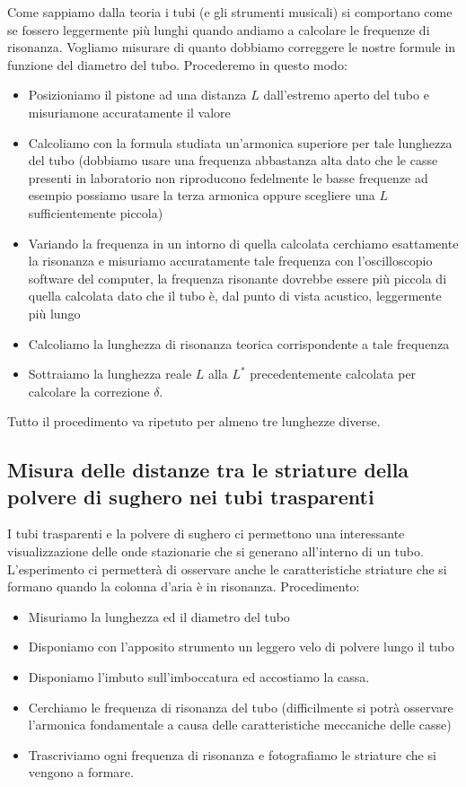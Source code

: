\documentclass[a4paper,10pt,oneside]{article}
\begin{document}
Come sappiamo dalla teoria i tubi (e gli strumenti musicali) si comportano come se fossero leggermente più lunghi quando andiamo a calcolare le frequenze di risonanza. Vogliamo misurare di quanto dobbiamo correggere le nostre formule in funzione del diametro del tubo. Procederemo in questo modo:
\begin{itemize}
 \item Posizioniamo il pistone ad una distanza $L$ dall'estremo aperto del tubo e misuriamone accuratamente il valore
 \item Calcoliamo con la formula studiata un'armonica superiore per tale lunghezza del tubo (dobbiamo usare una frequenza abbastanza alta dato che le casse presenti in laboratorio non riproducono fedelmente le basse frequenze ad esempio possiamo usare la terza armonica oppure scegliere una $L$ sufficientemente piccola)
 \item Variando la frequenza in un intorno di quella calcolata cerchiamo esattamente la risonanza  e misuriamo accuratamente tale frequenza con l'oscilloscopio software del computer, la frequenza risonante dovrebbe essere più piccola di quella calcolata dato che il tubo è, dal punto di vista acustico, leggermente più lungo
\item Calcoliamo la lunghezza di risonanza teorica corrispondente a tale frequenza
\item Sottraiamo la lunghezza reale $L$ alla $L^*$ precedentemente calcolata per calcolare la correzione $\delta$.
\end{itemize}

Tutto il procedimento va ripetuto per almeno tre lunghezze diverse.

\subsection{Misura delle distanze tra le striature della polvere di sughero nei tubi trasparenti}

I tubi trasparenti e la polvere di sughero ci permettono una interessante visualizzazione delle onde stazionarie che si generano all'interno di un tubo. L'esperimento ci permetterà di osservare anche le caratteristiche striature che si formano quando la colonna d'aria è  in risonanza. 
Procedimento:
\begin{itemize}
 \item Misuriamo la lunghezza ed il diametro del tubo
 \item Disponiamo con l'apposito strumento un leggero velo di polvere lungo il tubo
 \item Disponiamo l'imbuto sull'imboccatura ed accostiamo la cassa.
 \item Cerchiamo le frequenza di risonanza del tubo (difficilmente si potrà osservare l'armonica fondamentale a causa delle caratteristiche meccaniche delle casse)
 \item Trascriviamo ogni frequenza di risonanza e fotografiamo le striature che si vengono a formare.

\end{itemize}
\end{document}
